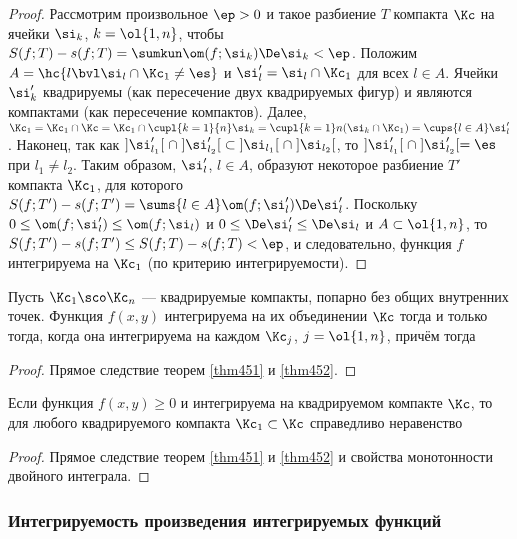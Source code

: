 \documentclass[a4paper]{article}
\begin{document}
\begin{proof}
Рассмотрим произвольное $\ep>0$ и такое разбиение $T$ компакта $\Kc$
на ячейки $\si_k$, $k=\ol{1,n}$, чтобы $S(f;T)-s(f;T)=\sumkun
\om(f;\si_k)\De\si_k<\ep$. Положим $A = \hc{ l \bvl \si_l \cap
\Kc_1\ne\es}$ и $\si'_l = \si_l\cap\Kc_1$ для всех $l\in A$. Ячейки
$\si'_k$ квадрируемы (как пересечение двух квадрируемых фигур) и
являются компактами (как пересечение компактов). Далее,
$\Kc_1=\Kc_1\cap\Kc = \Kc_1\cap \cupl{k=1}{n}\si_k = \cupl{k=1}n
(\si_k\cap\Kc_1)=\cups{l\in A}\si'_l$. Наконец, так как
$]\si'_{l_1}[ \; \cap \; ]\si'_{l_2}[ \; \subset \; ]\si_{l_1}[ \;
\cap \; ]\si_{l_2}[$, то $]\si'_{l_1}[ \; \cap \; ]\si'_{l_2}[ =
\es$ при $l_1\ne l_2$. Таким образом, $\si'_l$, $l\in A$, образуют
некоторое разбиение $T'$ компакта $\Kc_1$, для которого $S(f;T') -
s(f;T') = \sums{l\in A} \om(f;\si'_l)\De\si'_l$. Поскольку
$0\le\om(f;\si'_l)\le \om(f;\si_l)$ и $0\le \De \si'_l \le \De
\si_l$ и $A\subset\ol{1,n}$, то $S(f;T')-s(f;T') \le
S(f;T)-s(f;T)<\ep$, и следовательно, функция $f$ интегрируема на
$\Kc_1$ (по критерию интегрируемости).
\end{proof}

\begin{imp}
Пусть $\Kc_1 \sco \Kc_n$ --- квадрируемые компакты, попарно без
общих внутренних точек. Функция $f(x,y)$ интегрируема на их
объединении $\Kc$ тогда и только тогда, когда она интегрируема на
каждом $\Kc_j$, $j=\ol{1,n}$, причём тогда 
\end{imp}

\begin{proof}
Прямое следствие теорем \ref{thm451} и \ref{thm452}.
\end{proof}

\begin{imp}
Если функция $f(x,y)\ge0$ и интегрируема на квадрируемом компакте
$\Kc$, то для любого квадрируемого компакта $\Kc_1\subset\Kc$
справедливо неравенство 
\end{imp}

\begin{proof}
Прямое следствие теорем \ref{thm451} и \ref{thm452} и свойства
монотонности двойного интеграла.
\end{proof}

\subsubsection{Интегрируемость произведения интегрируемых функций}
\end{document}
